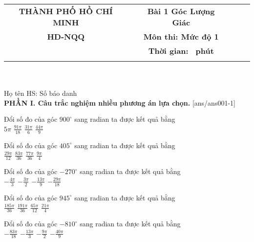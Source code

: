 \documentclass[12pt,a4paper]{article}
\newcommand{\tenso}{THÀNH PHỐ HỒ CHÍ MINH}
\newcommand{\tentruong}{HD-NQQ}
\newcommand{\tenkythi}{Bài 1 Góc Lượng Giác }
\newcommand{\tenmonthi}{Môn thi: Mức độ 1}
\newcommand{\thoigian}{}
\newcommand{\tieude}[1]{
   \begin{tabular}{cm{3cm}cm{3cm}cm{3cm}}
    {\bf \tenso} & & {\bf \tenkythi} \\
    {\bf \tentruong} & & {\bf \tenmonthi}\\
    && {\bf Thời gian: \bf \thoigian \, phút}\\
    && { \fbox{\bf Mã đề: #1}}
   \end{tabular}\\\\
    
   {Họ tên HS: \dotfill Số báo danh \dotfill}\\
}
\newcommand{\chantrang}[2]{\rfoot{Trang \thepage $-$ Mã đề #2}}
\begin{document}


\tieude{001}
\chantrang{\pageref{LastPage}}{001}
\setcounter{page}{1}
{\bf PHẦN I. Câu trắc nghiệm nhiều phương án lựa chọn.}
\setcounter{ex}{0}
[ans/ans001-1]
\begin{ex}
 Đổi số đo của góc $900^\circ$ sang radian ta được kết quả bằng\\ 
\choice
{ \True $5 \pi$ }
   { $\frac{91 \pi}{18}$ }
     { $\frac{31 \pi}{6}$ }
    { $\frac{44 \pi}{9}$ }
\end{ex}

\begin{ex}
 Đổi số đo của góc $405^\circ$ sang radian ta được kết quả bằng\\ 
\choice
{ $\frac{29 \pi}{12}$ }
   { $\frac{83 \pi}{36}$ }
     { $\frac{77 \pi}{36}$ }
    { \True $\frac{9 \pi}{4}$ }
\end{ex}

\begin{ex}
 Đổi số đo của góc $-270^\circ$ sang radian ta được kết quả bằng\\ 
\choice
{ $- \frac{4 \pi}{3}$ }
   { \True $- \frac{3 \pi}{2}$ }
     { $- \frac{13 \pi}{9}$ }
    { $- \frac{29 \pi}{18}$ }
\end{ex}

\begin{ex}
 Đổi số đo của góc $945^\circ$ sang radian ta được kết quả bằng\\ 
\choice
{ $\frac{185 \pi}{36}$ }
   { $\frac{191 \pi}{36}$ }
     { $\frac{65 \pi}{12}$ }
    { \True $\frac{21 \pi}{4}$ }
\end{ex}

\begin{ex}
 Đổi số đo của góc $-810^\circ$ sang radian ta được kết quả bằng\\ 
\choice
{ $- \frac{83 \pi}{18}$ }
   { $- \frac{13 \pi}{3}$ }
     { \True $- \frac{9 \pi}{2}$ }
    { $- \frac{40 \pi}{9}$ }
\end{ex}
\end{document}
